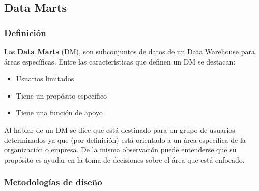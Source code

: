 \documentclass[a4paper,11pt]{article}
\begin{document}
    \subsection{Data Marts}
    
    \subsubsection{Definición}

    Los \textbf{Data Marts} (DM), son subconjuntos de datos de un Data Warehouse para áreas específicas.
    Entre las características que definen un DM se destacan:
    
    \begin{itemize}
      \item Usuarios limitados
      \item Tiene un propósito específico
      \item Tiene una función de apoyo
    \end{itemize}
    
    Al hablar de un DM se dice que está destinado para un grupo de usuarios determinados ya que (por definición) está orientado a un área específica de la
    organización o empresa. De la misma observación puede entenderse que su propósito es ayudar en la toma de decisiones sobre el área que está enfocado.
    
    \subsubsection{Metodologías de diseño}
    
\end{document}
